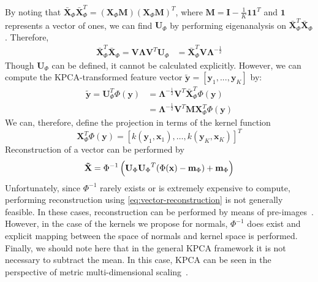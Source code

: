 By noting that
$\mathbf{\bar{X}}_\Phi \mathbf{\bar{X}}_\Phi^T = (\mathbf{X}_\Phi \mathbf{M}) (\mathbf{X}_\Phi \mathbf{M})^T$,
where $\mathbf{M} = \mathbf{I} - \frac{1}{K} \mathbf{1} \mathbf{1}^T$ and
$\mathbf{1}$ represents a vector of ones, we can find
$\mathbf{U}_\Phi$ by performing eigenanalysis on
$\bar{\mathbf{X}}_\Phi^T \bar{\mathbf{X}}_\Phi$. Therefore,
\begin{equation}
    \begin{aligned}\label{eq:x-bar-corr}
        \mathbf{\bar{X}}_\Phi^T \mathbf{\bar{X}}_\Phi = \mathbf{V} \boldsymbol{\Lambda} \mathbf{V}^T \mathbf{U}_{\Phi} &= \mathbf{\bar{X}}_\Phi^T \mathbf{V} \boldsymbol{\Lambda}^{-\frac{1}{2}}
    \end{aligned}
\end{equation}
Though $\mathbf{U}_\Phi$ can be defined, it cannot be calculated explicitly.
However, we can compute the KPCA-transformed feature vector
 $\mathbf{\tilde{y}} = [\mathbf{y}_1, ..., \mathbf{y}_K]$ by:
\begin{equation}
    \begin{aligned}\label{eq:projections}
        \mathbf{\tilde{y}} = \mathbf{U}_\Phi^T \Phi(\mathbf{y}) &= \boldsymbol{\Lambda}^{-\frac{1}{2}} \mathbf{V}^T \mathbf{\bar{X}}_\Phi^T \Phi(\mathbf{y}) \\
        &= \boldsymbol{\Lambda}^{-\frac{1}{2}} \mathbf{V}^T \mathbf{M} \mathbf{X}_\Phi^T \Phi(\mathbf{y})
    \end{aligned}
\end{equation}
We can, therefore, define the projection in terms of the kernel function
\begin{equation}\label{eq:kernel-vector}
        \mathbf{X}_\Phi^T \Phi(\mathbf{y}) = \left[ k(\mathbf{y}_1, \mathbf{x}_1), \ldots, k(\mathbf{y}_K, \mathbf{x}_K) \right]^T
\end{equation}
Reconstruction of a vector can be performed by
\begin{equation}\label{eq:vector-reconstruction}
        \boldsymbol{\mathbf{\tilde{X}}} = {\Phi}^{-1} \left( \mathbf{U}_{\Phi} {\mathbf{U}_{\Phi}}^T (\Phi(\mathbf{x}) - \mathbf{m}_{\Phi}) + \mathbf{m}_{\Phi} \right)
\end{equation}
Unfortunately, since ${\Phi}^{-1}$ rarely exists or is extremely expensive to
compute, performing reconstruction using \cref{eq:vector-reconstruction} is not
generally feasible. In these cases, reconstruction can be performed by means of
pre-images~\cite{kwok2004pre}. However, in the case of the kernels we propose
for normals, ${\Phi}^{-1}$ does exist and explicit mapping between the space of
normals and kernel space is performed. Finally, we should note here that in the
general KPCA framework it is not necessary to subtract the mean. In this case,
KPCA can be seen in the perspective of metric multi-dimensional
scaling~\cite{williams2002connection}.
